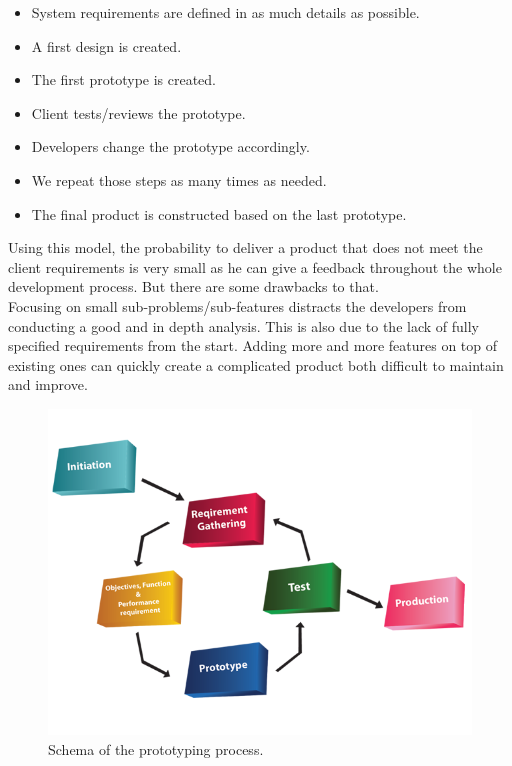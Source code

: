 \documentclass[12pt]{article}
\theoremstyle{definition}
\theoremstyle{definition}
\begin{document}
\begin{itemize}

\item System requirements are defined in as much details as possible.
\item A first design is created.
\item The first prototype is created.
\item Client tests/reviews the prototype.
\item Developers change the prototype accordingly.
\item We repeat those steps as many times as needed.
\item The final product is constructed based on the last prototype.

\end{itemize}

Using this model, the probability to deliver a product that does not meet the client requirements is very small as he can give a feedback throughout the whole development process. But there are some drawbacks to that.\\

Focusing on small sub-problems/sub-features distracts the developers from conducting a good and in depth analysis. This is also due to the lack of fully specified requirements from the start. Adding more and more features on top of existing ones can quickly create a complicated product both difficult to maintain and improve.\\

\begin{figure}
    \centering
    \includegraphics[scale=0.4]{prototyping.png}
    \caption{Schema of the prototyping process.}
    \label{Prototyping}
\end{figure}
\end{document}

